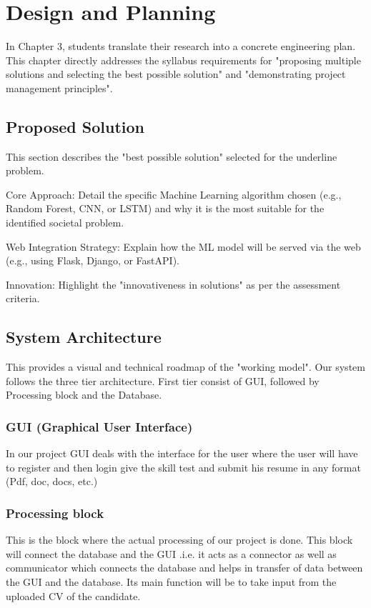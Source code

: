
\chapter{Design and Planning}

In Chapter 3, students translate their research into a concrete engineering plan. This chapter directly addresses the syllabus requirements for "proposing multiple solutions and selecting the best possible solution" and "demonstrating project management principles".

\section{Proposed Solution}	
This section describes the "best possible solution" selected for the underline problem.

Core Approach: Detail the specific Machine Learning algorithm chosen (e.g., Random Forest, CNN, or LSTM) and why it is the most suitable for the identified societal problem.

Web Integration Strategy: Explain how the ML model will be served via the web (e.g., using Flask, Django, or FastAPI).

Innovation: Highlight the "innovativeness in solutions" as per the assessment criteria.

\section{System Architecture}	  
This provides a visual and technical roadmap of the "working model". Our system follows the three tier architecture. First tier consist of GUI, followed by Processing block and the Database.

\subsection{GUI (Graphical User Interface)}
In our project GUI deals with the interface for the user where the user will have to register and then login give the skill test and submit his resume in any format (Pdf, doc, docs, etc.)

\subsection{Processing block}
This is the block where the actual processing of our project is done. This block will connect the database and the GUI .i.e. it acts as a connector as well as communicator which connects the database and helps in transfer of data between the GUI and the database. Its main function will be to take input from the uploaded CV of the candidate.

